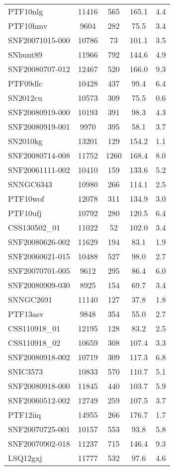 \begin{longtable}{lcccc}
PTF10nlg & 11416 & 565 & 165.1 & 4.4 \\
PTF10hmv & 9604 & 282 & 75.5 & 3.4 \\
SNF20071015-000 & 10786 & 73 & 101.1 & 3.5 \\
SNhunt89 & 11966 & 792 & 144.6 & 4.9 \\
SNF20080707-012 & 12467 & 520 & 166.0 & 9.3 \\
PTF09dlc & 10428 & 437 & 99.4 & 6.4 \\
SN2012cu & 10573 & 309 & 75.5 & 0.6 \\
SNF20080919-000 & 10193 & 391 & 98.3 & 4.3 \\
SNF20080919-001 & 9970 & 395 & 58.1 & 3.7 \\
SN2010kg & 13201 & 129 & 154.2 & 1.1 \\
SNF20080714-008 & 11752 & 1260 & 168.4 & 8.0 \\
SNF20061111-002 & 10410 & 159 & 133.6 & 5.2 \\
SNNGC6343 & 10980 & 266 & 114.1 & 2.5 \\
PTF10wof & 12078 & 311 & 134.9 & 3.0 \\
PTF10ufj & 10792 & 280 & 120.5 & 6.4 \\
CSS130502\_01 & 11022 & 52 & 102.0 & 3.4 \\
SNF20080626-002 & 11629 & 194 & 83.1 & 1.9 \\
SNF20060621-015 & 10488 & 527 & 98.0 & 2.7 \\
SNF20070701-005 & 9612 & 295 & 86.4 & 6.0 \\
SNF20080909-030 & 8925 & 154 & 69.7 & 3.4 \\
SNNGC2691 & 11140 & 127 & 37.8 & 1.8 \\
PTF13asv & 9848 & 354 & 55.0 & 2.7 \\
CSS110918\_01 & 12195 & 128 & 83.2 & 2.5 \\
CSS110918\_02 & 10659 & 308 & 107.4 & 3.3 \\
SNF20080918-002 & 10719 & 309 & 117.3 & 6.8 \\
SNIC3573 & 10833 & 570 & 110.7 & 5.1 \\
SNF20080918-000 & 11845 & 440 & 103.7 & 5.9 \\
SNF20060512-002 & 12749 & 259 & 107.5 & 3.7 \\
PTF12iiq & 14955 & 266 & 176.7 & 1.7 \\
SNF20070725-001 & 10157 & 553 & 93.8 & 5.8 \\
SNF20070902-018 & 11237 & 715 & 146.4 & 9.3 \\
LSQ12gxj & 11777 & 532 & 97.6 & 4.6 \\

\end{longtable}
